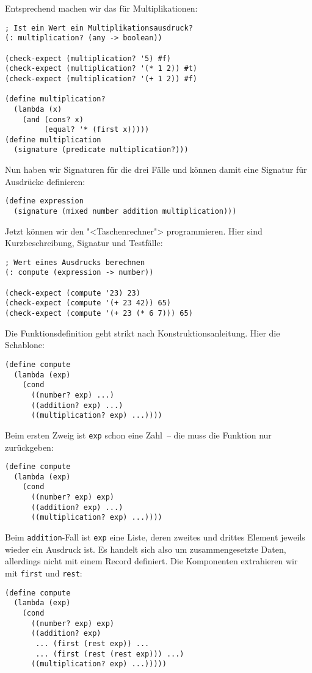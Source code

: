 %
Entsprechend machen wir das für Multiplikationen:
%
\begin{lstlisting}
; Ist ein Wert ein Multiplikationsausdruck?
(: multiplication? (any -> boolean))

(check-expect (multiplication? '5) #f)
(check-expect (multiplication? '(* 1 2)) #t)
(check-expect (multiplication? '(+ 1 2)) #f)

(define multiplication?
  (lambda (x)
    (and (cons? x)
         (equal? '* (first x)))))
(define multiplication
  (signature (predicate multiplication?)))
\end{lstlisting}
%
Nun haben wir Signaturen für die drei Fälle und können damit eine
Signatur für Ausdrücke definieren:
%
\begin{lstlisting}
(define expression
  (signature (mixed number addition multiplication)))
\end{lstlisting}
%
Jetzt können wir den "<Taschenrechner"> programmieren.  Hier sind
Kurzbeschreibung, Signatur und Testfälle:
%
\begin{lstlisting}
; Wert eines Ausdrucks berechnen
(: compute (expression -> number))

(check-expect (compute '23) 23)
(check-expect (compute '(+ 23 42)) 65)
(check-expect (compute '(+ 23 (* 6 7))) 65)
\end{lstlisting}
%
Die Funktionsdefinition geht strikt nach Konstruktionsanleitung.  Hier
die Schablone:
%
\begin{lstlisting}
(define compute
  (lambda (exp)
    (cond
      ((number? exp) ...)
      ((addition? exp) ...)
      ((multiplication? exp) ...))))
\end{lstlisting}
%
Beim ersten Zweig ist \lstinline{exp} schon eine Zahl~-- die muss die
Funktion nur zurückgeben:
%
\begin{lstlisting}
(define compute
  (lambda (exp)
    (cond
      ((number? exp) exp)
      ((addition? exp) ...)
      ((multiplication? exp) ...))))
\end{lstlisting}
%
Beim \lstinline{addition}-Fall ist \lstinline{exp} eine Liste, deren
zweites und drittes Element jeweils wieder ein Ausdruck ist.  Es
handelt sich also um zusammengesetzte Daten, allerdings nicht mit
einem Record definiert.  Die Komponenten extrahieren wir mit
\lstinline{first} und \lstinline{rest}:
%
\begin{lstlisting}
(define compute
  (lambda (exp)
    (cond
      ((number? exp) exp)
      ((addition? exp)
       ... (first (rest exp)) ...
       ... (first (rest (rest exp))) ...)
      ((multiplication? exp) ...)))))
\end{lstlisting}
